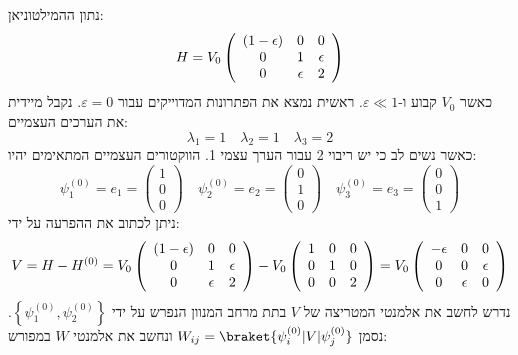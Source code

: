 \documentclass{tstextbook}
\begin{document}
\begin{example}
נתון ההמילטוניאן:
$$H=V_{0}\left(\begin{array}{c c c}{{(1-\epsilon)}}&{{0}}&{{0}}\\ {{0}}&{{1}}&{{\epsilon}}\\ {{0}}&{{\epsilon}}&{{2}}\end{array}\right)$$
כאשר \(V_{0}\) קבוע ו-\(\varepsilon\ll 1\). ראשית נמצא את הפתרונות המדוייקים עבור \(\varepsilon=0\). נקבל מיידית את הערכים העצמיים:
$$\lambda_{1}=1\quad\lambda_{2}=1\quad\lambda_{3}=2$$
כאשר נשים לב כי יש ריבוי 2 עבור הערך עצמי 1. הווקטורים העצמיים המתאימים יהיו:
$$\psi_{1}^{(0)}=e_{1}=\begin{pmatrix}1\\ 0\\ 0\end{pmatrix}\quad\psi_{2}^{(0)}=e_{2}=\begin{pmatrix}0\\ 1\\ 0\end{pmatrix}\quad\psi_{3}^{(0)}=e_{3}=\begin{pmatrix}0\\ 0\\ 1\end{pmatrix}$$
ניתן לכתוב את ההפרעה על ידי:
$$V=H-H^{(0)}=V_{0}\left(\begin{array}{c c c}{{(1-\epsilon)}}&{{0}}&{{0}}\\ {{0}}&{{1}}&{{\epsilon}}\\ {{0}}&{{\epsilon}}&{{2}}\end{array}\right)-V_{0}\left(\begin{array}{c c c}{{1}}&{{0}}&{{0}}\\ {{0}}&{{1}}&{{0}}\\ {{0}}&{{0}}&{{2}}\end{array}\right)=V_{0}\left(\begin{array}{c c c}{{-\epsilon}}&{{0}}&{{0}}\\ {{0}}&{{0}}&{{\epsilon}}\\ {{0}}&{{\epsilon}}&{{0}}\end{array}\right)$$
נדרש לחשב את אלמנטי המטריצה של \(V\) בתת מרחב המנוון הנפרש על ידי \(\left\{  \psi_{1}^{(0)},\psi^{(0)}_{2}  \right\}\). נסמן \(W_{ij}=\braket{ \psi_{i}^{(0)} | V|\psi_{j}^{(0)} }\) ונחשב את אלמנטי \(W\) במפורש:

\end{example}
\end{document}
